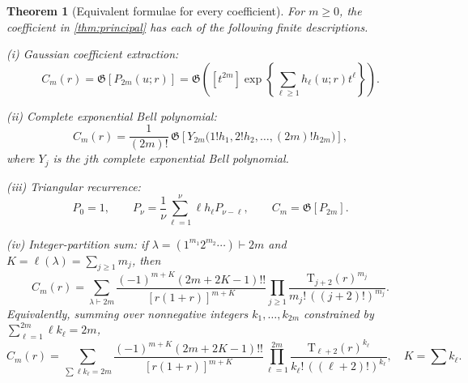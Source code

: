 \documentclass[11pt,a4paper]{article}
\newtheorem{theorem}{Theorem}[section]
\theoremstyle{definition}
\newcommand{\Touch}{\mathrm T}
\newcommand{\Gaus}{\mathfrak G}
\begin{document}
\begin{theorem}[Equivalent formulae for every coefficient]
\label{thm:coefficient-calculus}
For $m\ge0$, the coefficient in \cref{thm:principal} has each of the following
finite descriptions.

\smallskip
\noindent\textup{(i) Gaussian coefficient extraction:}
\begin{equation}\label{eq:C-gaussian}
 C_m(r)=\Gaus[P_{2m}(u;r)]
 =\Gaus\!\left([t^{2m}]
 \exp\!\left\{\sum_{\ell\ge1}h_\ell(u;r)t^\ell\right\}\right).
\end{equation}

\smallskip
\noindent\textup{(ii) Complete exponential Bell polynomial:}
\begin{equation}\label{eq:C-complete-Bell}
 C_m(r)=\frac1{(2m)!}\,
 \Gaus\!\left[
 Y_{2m}\bigl(1!h_1,2!h_2,\ldots,(2m)!h_{2m}\bigr)
 \right],
\end{equation}
where $Y_j$ is the $j$th complete exponential Bell polynomial.

\smallskip
\noindent\textup{(iii) Triangular recurrence:}
\begin{equation}\label{eq:P-recurrence}
 P_0=1,
 \qquad
 P_\nu=\frac1\nu\sum_{\ell=1}^{\nu}
 \ell h_\ell P_{\nu-\ell},
 \qquad C_m=\Gaus[P_{2m}].
\end{equation}

\smallskip
\noindent\textup{(iv) Integer-partition sum:}
if $\lambda=(1^{m_1}2^{m_2}\cdots)\vdash2m$ and
$K=\ell(\lambda)=\sum_{j\ge1}m_j$, then
\begin{equation}\label{eq:C-partition}
 C_m(r)=\sum_{\lambda\vdash2m}
 \frac{(-1)^{m+K}(2m+2K-1)!!}
      {[r(1+r)]^{m+K}}
 \prod_{j\ge1}
 \frac{\Touch_{j+2}(r)^{m_j}}
      {m_j!\,((j+2)!)^{m_j}}.
\end{equation}
Equivalently, summing over nonnegative integers
$k_1,\ldots,k_{2m}$ constrained by
$\sum_{\ell=1}^{2m}\ell k_\ell=2m$,
\begin{equation}\label{eq:C-multiindex}
 C_m(r)=
 \sum_{\sum \ell k_\ell=2m}
 \frac{(-1)^{m+K}(2m+2K-1)!!}
      {[r(1+r)]^{m+K}}
 \prod_{\ell=1}^{2m}
 \frac{\Touch_{\ell+2}(r)^{k_\ell}}
      {k_\ell!\,((\ell+2)!)^{k_\ell}},
 \quad K=\sum k_\ell.
\end{equation}
\end{theorem}
\end{document}
